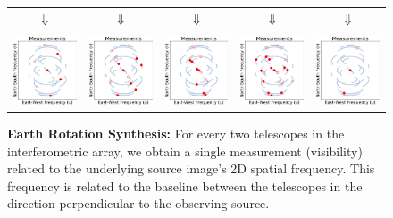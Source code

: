 \begin{figure}[h!]
\begin{center}
\begin{tabular}{ c  c  c  c  c  }
			\\
			\Large{$\Downarrow$}  &   \Large{$\Downarrow$}  & \Large{$\Downarrow$} & \Large{$\Downarrow$}& \Large{$\Downarrow$}     \\
			& \vspace{-.1in}
			\\
			{{\includegraphics[width=.17\linewidth]{figures/uvcoverage/frames4/uv_singleptbig_merge_4.pdf}} } &
			{{\includegraphics[width=.17\linewidth]{figures/uvcoverage/frames4/uv_singleptbig_merge_40.pdf}} } &
			{\includegraphics[width=.17\linewidth]{figures/uvcoverage/frames4/uv_singleptbig_merge_74.pdf}} %
			&
			{\includegraphics[width=.17\linewidth]{figures/uvcoverage/frames4/uv_singleptbig_merge_111.pdf}} &
			{\includegraphics[width=.17\linewidth]{figures/uvcoverage/frames4/uv_singleptbig_merge_159.pdf}} %
			\\
		\end{tabular}
		\caption{{\bf Earth Rotation Synthesis:} For every two telescopes in the interferometric array, we obtain a single measurement (visibility) related to the underlying source image's 2D spatial frequency. This frequency is related to the baseline between the telescopes in the direction perpendicular to the observing source. 
}
\end{center}
\end{figure}
